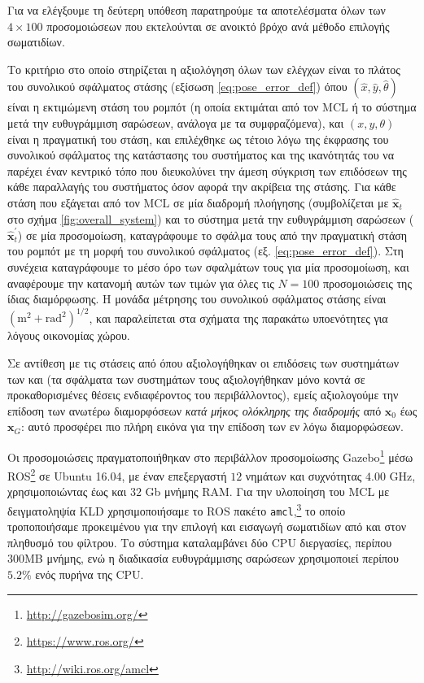 Για να ελέγξουμε τη δεύτερη υπόθεση παρατηρούμε τα αποτελέσματα όλων των
$4\times100$ προσομοιώσεων που εκτελούνται σε ανοικτό βρόχο ανά μέθοδο
επιλογής σωματιδίων.

Το κριτήριο στο οποίο στηρίζεται η αξιολόγηση όλων των ελέγχων είναι το πλάτος
του συνολικού σφάλματος στάσης (εξίσωση \ref{eq:pose_error_def}) όπου
$(\hat{x}, \hat{y}, \hat{\theta})$ είναι η εκτιμώμενη στάση του ρομπότ (η οποία
εκτιμάται από τον MCL ή το σύστημα μετά την ευθυγράμμιση σαρώσεων, ανάλογα με
τα συμφραζόμενα), και $(x,y,\theta)$ είναι η πραγματική του στάση, και
επιλέχθηκε ως τέτοιο λόγω της έκφρασης του συνολικού σφάλματος της κατάστασης
του συστήματος και της ικανότητάς του να παρέχει έναν κεντρικό τόπο που
διευκολύνει την άμεση σύγκριση των επιδόσεων της κάθε παραλλαγής του συστήματος
όσον αφορά την ακρίβεια της στάσης. Για κάθε στάση που εξάγεται από τον MCL σε
μία διαδρομή πλοήγησης (συμβολίζεται με $\hat{\bm{x}}_t$ στο σχήμα
\ref{fig:overall_system}) και το σύστημα μετά την ευθυγράμμιση σαρώσεων
($\hat{\bm{x}}^{\prime}_t$) σε μία προσομοίωση, καταγράφουμε το σφάλμα τους από
την πραγματική στάση του ρομπότ με τη μορφή του συνολικού σφάλματος (εξ.
\ref{eq:pose_error_def}). Στη συνέχεια καταγράφουμε το μέσο όρο των
σφαλμάτων τους για μία προσομοίωση, και αναφέρουμε την κατανομή αυτών των τιμών
για όλες τις $N = 100$ προσομοιώσεις της ίδιας διαμόρφωσης. Η μονάδα μέτρησης
του συνολικού σφάλματος στάσης είναι $(\text{m}^2+\text{rad}^2)^{1/2}$, και
παραλείπεται στα σχήματα της παρακάτω υποενότητες για λόγους οικονομίας χώρου.

Σε αντίθεση με τις στάσεις από όπου αξιολογήθηκαν οι επιδόσεις των συστημάτων
των \cite{Rowekamper2012a} και \cite{Vasiljevic2016a}(τα σφάλματα των
συστημάτων τους αξιολογήθηκαν μόνο κοντά σε προκαθορισμένες θέσεις
ενδιαφέροντος του περιβάλλοντος), εμείς αξιολογούμε την επίδοση των ανωτέρω
διαμορφόσεων \textit{κατά μήκος ολόκληρης της διαδρομής} από $\bm{x}_0$ έως
$\bm{x}_G$: αυτό προσφέρει πιο πλήρη εικόνα για την επίδοση των εν λόγω
διαμορφώσεων.

Οι προσομοιώσεις πραγματοποιήθηκαν στο περιβάλλον προσομοίωσης
Gazebo\footnote{\url{http://gazebosim.org/}} μέσω
ROS\footnote{\url{https://www.ros.org/}} σε Ubuntu 16.04, με έναν επεξεργαστή
$12$ νημάτων και συχνότητας $4.00$ GHz, χρησιμοποιώντας έως και $32$ Gb μνήμης
RAM. Για την υλοποίηση του MCL με δειγματοληψία KLD χρησιμοποιήσαμε το ROS
πακέτο \texttt{amcl},\footnote{\url{http://wiki.ros.org/amcl}} το οποίο
τροποποιήσαμε προκειμένου για την επιλογή και εισαγωγή σωματιδίων από και στον
πληθυσμό του φίλτρου. Το σύστημα καταλαμβάνει δύο CPU διεργασίες, περίπου 300MB
μνήμης, ενώ η διαδικασία ευθυγράμμισης σαρώσεων χρησιμοποιεί περίπου $5.2\%$
ενός πυρήνα της CPU.


